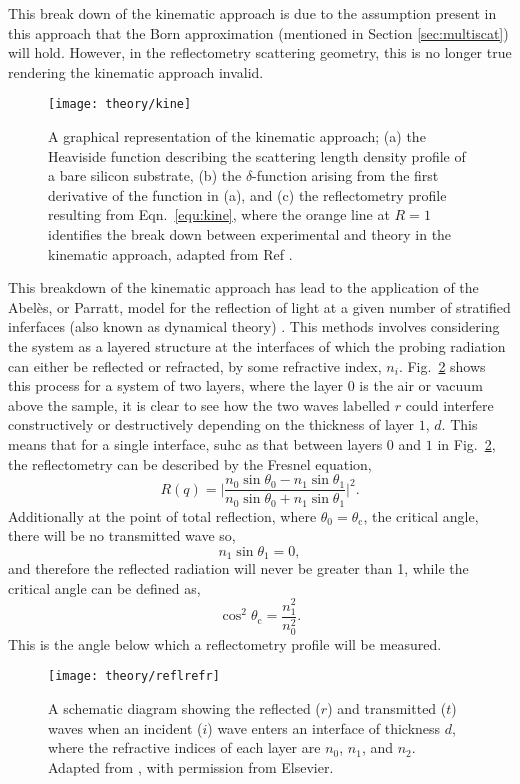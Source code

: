 This break down of the kinematic approach is due to the assumption present in this approach that the Born approximation (mentioned in Section \ref{sec:multiscat}) will hold.
However, in the reflectometry scattering geometry, this is no longer true rendering the kinematic approach invalid.
%
\begin{figure}
	\centering
	\texttt{[image: theory/kine]}
	\caption{A graphical representation of the kinematic approach; (a) the Heaviside function describing the scattering length density profile of a bare silicon substrate, (b) the $\delta$-function arising from the first derivative of the function in (a), and (c) the reflectometry profile resulting from Eqn.~\ref{equ:kine}, where the orange line at $R=1$ identifies the break down between experimental and theory in the kinematic approach, adapted from Ref \cite{Sivia2011}.}
	\label{fig:kine}
\end{figure}
%

This breakdown of the kinematic approach has lead to the application of the Abel\`{e}s, or Parratt, model for the reflection of light at a given number of stratified inferfaces (also known as dynamical theory) \cite{Abeles1948,Parratt1954}.
This methods involves considering the system as a layered structure at the interfaces of which the probing radiation can either be reflected or refracted, by some refractive index, $n_i$.
Fig.~\ref{fig:reflrefr} shows this process for a system of two layers, where the layer $0$ is the air or vacuum above the sample, it is clear to see how the two waves labelled $r$ could interfere constructively or destructively depending on the thickness of layer $1$, $d$.
This means that for a single interface, suhc as that between layers $0$ and $1$ in Fig.~\ref{fig:reflrefr}, the reflectometry can be described by the Fresnel equation,
%
\begin{equation}
	R(q) = \bigg| \frac{n_0\sin{\theta_0} - n_1\sin{\theta_1}}{n_0\sin{\theta_0} + n_1\sin{\theta_1}} \bigg|^2.
\end{equation}
%
Additionally at the point of total reflection, where $\theta_0 = \theta_{\text{c}}$, the critical angle, there will be no transmitted wave so,
%
\begin{equation}
	n_1\sin{\theta_1} = 0,
\end{equation}
%
and therefore the reflected radiation will never be greater than 1, while the critical angle can be defined as,
%
\begin{equation}
	\cos^2{\theta_{\text{c}}} = \frac{n_1^2}{n_0^2}.
\end{equation}
%
This is the angle below which a reflectometry profile will be measured.
%
\begin{figure}
	\centering
	\texttt{[image: theory/reflrefr]}
	\caption{A schematic diagram showing the reflected ($r$) and transmitted ($t$) waves when an incident ($i$) wave enters an interface of thickness $d$, where the refractive indices of each layer are $n_0$, $n_1$, and $n_2$. Adapted from \cite{Foglia2015}, with permission from Elsevier.}
	\label{fig:reflrefr}
\end{figure}
%

